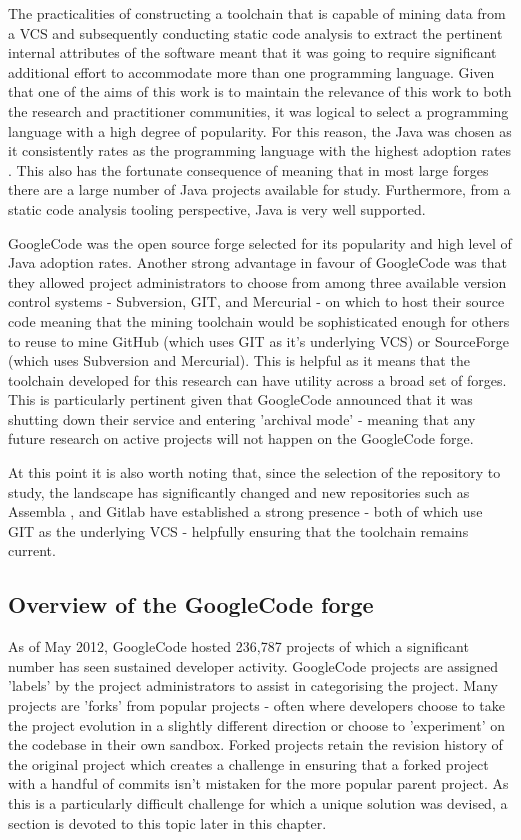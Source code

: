 The practicalities of constructing a toolchain that is capable of mining data from a VCS and subsequently conducting static code analysis to extract the pertinent internal attributes of the software meant that it was going to require significant additional effort to accommodate more than one programming language. Given that one of the aims of this work is to maintain the relevance of this work to both the research and practitioner communities, it was logical to select a programming language with a high degree of popularity. For this reason, the Java was chosen as it consistently rates as the programming language with the highest adoption rates \citep{tiobe2017}. This also has the fortunate consequence of meaning that in most large forges there are a large number of Java projects available for study.  Furthermore, from a static code analysis tooling perspective, Java is very well supported.

GoogleCode was the open source forge selected for its popularity and high level of Java adoption rates. Another strong advantage in favour of GoogleCode was that they allowed project administrators to choose from among three available version control systems - Subversion, GIT, and Mercurial - on which to host their source code meaning that the mining toolchain would be sophisticated enough for others to reuse to mine GitHub (which uses GIT as it's underlying VCS) or SourceForge (which uses Subversion and Mercurial). This is helpful as it means that the toolchain developed for this research can have utility across a broad set of forges. This is particularly pertinent given that GoogleCode announced that it was shutting down their service and entering 'archival mode' - meaning that any future research on active projects will not happen on the GoogleCode forge. 

At this point it is also worth noting that, since the selection of the repository to study, the landscape has significantly changed and new repositories such as Assembla \citep{assembla}, and Gitlab \citep{gitlab} have established a strong presence - both of which use GIT as the underlying VCS - helpfully ensuring that the toolchain remains current.

\subsection{Overview of the GoogleCode forge}
As of May 2012, GoogleCode hosted 236,787 projects of which a significant number has seen sustained developer activity. GoogleCode projects are assigned 'labels' by the project administrators to assist in categorising the project. Many projects are 'forks' from popular projects - often where developers choose to take the project evolution in a slightly different direction or choose to 'experiment' on the codebase in their own sandbox. Forked projects retain the revision history of the original project which creates a challenge in ensuring that a forked project with a handful of commits isn't mistaken for the more popular parent project. As this is a particularly difficult challenge for which a unique solution was devised, a section is devoted to this topic later in this chapter.

